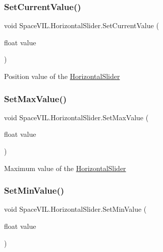 \subsubsection{\texorpdfstring{Set\+Current\+Value()}{SetCurrentValue()}}
{\footnotesize\ttfamily void Space\+V\+I\+L.\+Horizontal\+Slider.\+Set\+Current\+Value (\begin{DoxyParamCaption}\item[{float}]{value }\end{DoxyParamCaption})\hspace{0.3cm}{\ttfamily [inline]}}



Position value of the \mbox{\hyperlink{class_space_v_i_l_1_1_horizontal_slider}{Horizontal\+Slider}} 

\mbox{\label{class_space_v_i_l_1_1_horizontal_slider_a371d41e7d45c1d027a7d1a94209e4ecb}} 
\subsubsection{\texorpdfstring{Set\+Max\+Value()}{SetMaxValue()}}
{\footnotesize\ttfamily void Space\+V\+I\+L.\+Horizontal\+Slider.\+Set\+Max\+Value (\begin{DoxyParamCaption}\item[{float}]{value }\end{DoxyParamCaption})\hspace{0.3cm}{\ttfamily [inline]}}



Maximum value of the \mbox{\hyperlink{class_space_v_i_l_1_1_horizontal_slider}{Horizontal\+Slider}} 

\mbox{\label{class_space_v_i_l_1_1_horizontal_slider_aba8cd3fc86a3b670f03badbdd0a28b8c}} 
\subsubsection{\texorpdfstring{Set\+Min\+Value()}{SetMinValue()}}
{\footnotesize\ttfamily void Space\+V\+I\+L.\+Horizontal\+Slider.\+Set\+Min\+Value (\begin{DoxyParamCaption}\item[{float}]{value }\end{DoxyParamCaption})\hspace{0.3cm}{\ttfamily [inline]}}



